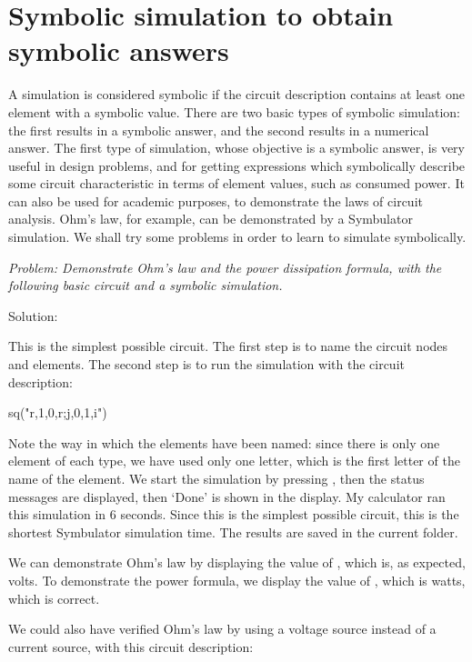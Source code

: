 \section{Symbolic simulation to obtain symbolic answers}

A simulation is considered symbolic if the circuit description
contains at least one element with a symbolic value. There are two
basic types of symbolic simulation: the first results in a symbolic
answer, and the second results in a numerical answer. The first type
of simulation, whose objective is a symbolic answer, is very useful
in design problems, and for getting expressions which symbolically
describe some circuit characteristic in terms of element values,
such as consumed power. It can also be used for academic purposes,
to demonstrate the laws of circuit analysis. Ohm's law, for example,
can be demonstrated by a Symbulator simulation. We shall try some
problems in order to learn to simulate symbolically.


\emph{Problem: Demonstrate Ohm's law and the power dissipation
formula, with the following basic circuit and a symbolic
simulation.}

Solution:

This is the simplest possible circuit. The first step is to name the
circuit nodes and elements. The second step is to run the simulation
with the circuit description:

\begin{entry}
sq\dc("r,1,0,r;j,0,1,i")
\end{entry}

Note the way in which the elements have been named: since there is
only one element of each type, we have used only one letter, which
is the first letter of the name of the element. We start the
simulation by pressing , then the status messages are
displayed, then `Done' is shown in the display. My calculator ran
this simulation in 6 seconds. Since this is the simplest possible
circuit, this is the shortest Symbulator simulation time. The
results are saved in the current folder.

We can demonstrate Ohm's law by displaying the value of ,
which is, as expected,  volts. To demonstrate the power
formula, we display the value of , which is
 watts, which is correct.

We could also have verified Ohm's law by using a voltage source
instead of a current source, with this circuit description:

